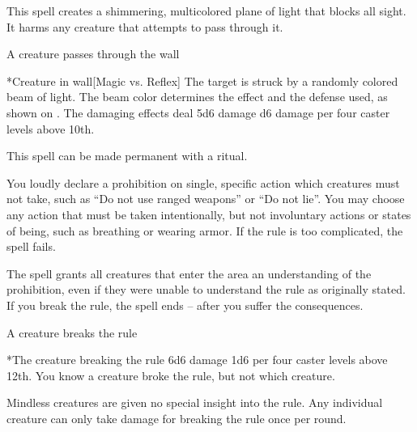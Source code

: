 \begin{spellheader}
    \spelldur{\durshort \dismissable}
\end{spellheader}
\begin{spelleffects}
    \spelleffect This spell creates a shimmering, multicolored plane of light that blocks all sight. It harms any creature that attempts to pass through it.
    \begin{spelltrigger}{A creature passes through the wall}
        \begin{spelltarget}*{Creature in wall}[Magic vs. Reflex]
            \spellspecial The target is struck by a randomly colored beam of light. The beam color determines the effect and the defense used, as shown on . The damaging effects deal 5d6 damage \add d6 damage per four caster levels above 10th.
        \end{spelltarget}
    \end{spelltrigger}
\end{spelleffects}
\begin{spellfooter}
    \spellnotes This spell can be made permanent with a  ritual.
\end{spellfooter}

\begin{spellheader}
    \spelldur{\durshort}
\end{spellheader}
\begin{spelleffects}
    \spelleffect You loudly declare a prohibition on single, specific action which creatures must not take, such as ``Do not use ranged weapons'' or ``Do not lie''. You may choose any action that must be taken intentionally, but not involuntary actions or states of being, such as breathing or wearing armor. If the rule is too complicated, the spell fails.

    The spell grants all creatures that enter the area an understanding of the prohibition, even if they were unable to understand the rule as originally stated. If you break the rule, the spell ends -- after you suffer the consequences.
    \begin{spelltrigger}{A creature breaks the rule}
        \begin{spelltarget}*{The creature breaking the rule}
            \spelleffect 6d6 damage \add 1d6 per four caster levels above 12th. You know a creature broke the rule, but not which creature.
        \end{spelltarget}
    \end{spelltrigger}
\end{spelleffects}
\begin{spellfooter}
    \spellnotes Mindless creatures are given no special insight into the rule. Any individual creature can only take damage for breaking the rule once per round.
\end{spellfooter}

